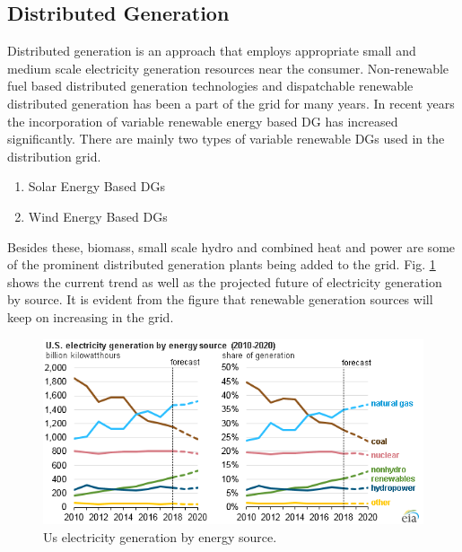 \subsection{Distributed Generation}
Distributed generation is an approach that employs appropriate small and medium scale electricity generation resources near the consumer. Non-renewable fuel based distributed generation technologies and dispatchable renewable distributed generation has been a part of the grid for many years. In recent years the incorporation of variable renewable energy based DG has increased significantly. There are mainly two types of variable renewable DGs used in the distribution grid.
\begin{enumerate}
    \item Solar Energy Based DGs
    \item Wind Energy Based DGs
\end{enumerate}
Besides these, biomass, small scale hydro and combined heat and power are some of the prominent distributed generation plants being added to the grid. Fig. \ref{fig:GROWTH_EIA} shows the current trend as well as the projected future of electricity generation by source. It is evident from the figure that renewable generation sources will keep on increasing in the grid. 

\begin{figure}[!h]
\centering
\includegraphics[width=0.85\linewidth]{figs/GROWTH_EIA.png}
\caption[Us electricity generation by energy source.]{Us electricity generation by energy source.\cite{EIA2018}}
\label{fig:GROWTH_EIA}
\end{figure}

